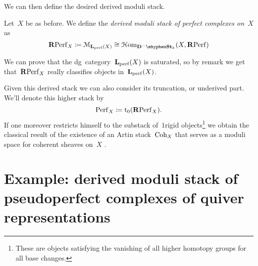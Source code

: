 \begin{refsection}
We can then define the desired derived moduli stack.
\begin{definition}
  Let~$X$ be as before. We define the \emph{derived moduli stack of perfect complexes on~$X$} as
  \begin{equation}
    \RPerf_X\coloneqq\mathcal{M}_{\LLL_\perf(X)}\cong\HHom_{\mathbf{D}^-\mhyphen\St_k}(X,\RPerf)
  \end{equation}
\end{definition}

\begin{remark}
  We can prove that the dg~category~$\mathbf{L}_{\mathrm{perf}}(X)$ is saturated, so by remark  we get that~$\mathbf{R}\mathrm{Perf}_X$ really classifies objects in~$\mathbf{L}_{\mathrm{perf}}(X)$.
\end{remark}

\begin{remark}
  Given this derived stack we can also consider its truncation, or underived part. We'll denote this higher stack by
  \begin{equation}
    \mathrm{Perf}_X\coloneqq\mathrm{t}_0(\mathbf{R}\mathrm{Perf}_X).
  \end{equation}
  If one moreover restricts himself to the substack of~$1$\dash rigid objects\footnote{These are objects satisfying the vanishing of all higher homotopy groups for all base changes.} we obtain the classical result of the existence of an Artin stack~$\mathrm{Coh}_X$ that serves as a moduli space for coherent sheaves on~$X$ \cite[th\'eor\`eme 4.6.2.1]{laumon-moret-bailly} \cite[tag 08CW]{stacks}.
\end{remark}


\section{Example: derived moduli stack of pseudoperfect complexes of quiver representations}
\label{section:example-2}

\printbibliography[heading = local]

\end{refsection}
